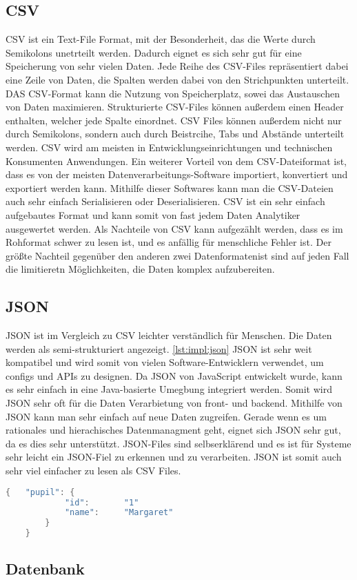\subsection{CSV}
CSV ist ein Text-File Format, mit der Besonderheit, das die Werte durch Semikolons unetrteilt werden. Dadurch eignet es sich sehr gut für eine Speicherung von sehr vielen Daten. Jede Reihe des CSV-Files repräsentiert dabei eine Zeile von Daten, die Spalten werden dabei von den Strichpunkten unterteilt. DAS CSV-Format kann die Nutzung von Speicherplatz, sowei das Austauschen von Daten maximieren. Strukturierte CSV-Files können außerdem einen Header enthalten, welcher jede Spalte einordnet. CSV Files können außerdem nicht nur durch Semikolons, sondern auch durch Beistrcihe, Tabs und Abstände unterteilt werden. CSV wird am meisten in Entwicklungseinrichtungen und technischen Konsumenten Anwendungen. Ein weiterer Vorteil von dem CSV-Dateiformat ist, dass es von der meisten Datenverarbeitungs-Software importiert, konvertiert und exportiert werden kann. Mithilfe dieser Softwares kann man die CSV-Dateien auch sehr einfach Serialisieren oder Deserialisieren. CSV ist ein sehr einfach aufgebautes Format und kann somit von fast jedem Daten Analytiker ausgewertet werden. Als Nachteile von CSV kann aufgezählt werden, dass es im Rohformat schwer zu lesen ist, und es anfällig für menschliche Fehler ist. Der größte Nachteil gegenüber den anderen zwei Datenformatenist sind auf jeden Fall die limitieretn Möglichkeiten, die Daten komplex aufzubereiten.   


\subsection{JSON}
JSON ist im Vergleich zu CSV leichter verständlich für Menschen. Die Daten werden als semi-strukturiert angezeigt. \ref{lst:impl:json} JSON ist sehr weit kompatibel und wird somit von vielen Software-Entwicklern verwendet, um configs und APIs zu designen. Da JSON von JavaScript entwickelt wurde, kann es sehr einfach in eine Java-basierte Umegbung integriert werden. Somit wird JSON sehr oft für die Daten Verarbietung von front- und backend. Mithilfe von JSON kann man sehr einfach auf neue Daten zugreifen. Gerade wenn es um rationales und hierachisches Datenmanagment geht, eignet sich JSON sehr gut, da es dies sehr unterstützt. JSON-Files sind selbserklärend und es ist für Systeme sehr leicht ein JSON-Fiel zu erkennen und zu verarbeiten. JSON ist somit auch sehr viel einfacher zu lesen als CSV Files. 


\begin{lstlisting}[language=java,caption=JSON Example,label=lst:impl:json]
    {   "pupil": {
            "id":       "1"
            "name":     "Margaret"
        }
    }
\end{lstlisting}

\subsection{Datenbank}